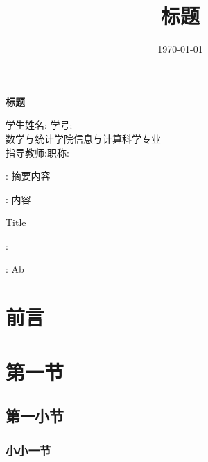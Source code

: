 \documentclass[UTF8,heading=true,12pt]{article}
\title{\songti \zihao{3}\bfseries 标题}
\author{}
\date{\today}
\begin{document}
    
    \newpage
    \tableofcontents%
    \setcounter{page}{0}%
    \thispagestyle{empty}%
    \newpage
    \begin{center}
    \songti {}\bfseries 标题
	\end{center}
	
	\begin{center}
    \songti {} 学生姓名: \qquad 学号: \\ 
    	\songti {} 数学与统计学院\qquad 信息与计算科学专业\\
    	\songti {} 指导教师:\qquad 职称:
    \end{center}
    : \quad\kaishu{} 摘要内容


    :\quad\kaishu{} 内容
    
    \begin{center}
    	 Title
    \end{center}
    :\quad{} \lipsum[1]
    
    :\quad{} Ab
    
    \section{前言}
	\lipsum[2]

    \section{第一节}
    \lipsum[3]

    \subsection{第一小节}
    \lipsum[4]

    \subsubsection{小小一节}
    \lipsum[5]

    
\end{document}
